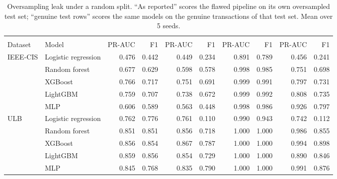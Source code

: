 \begin{table}[htbp]
\caption{Oversampling leak under a random split. ``As reported'' scores the flawed pipeline on its own oversampled test set; ``genuine test rows'' scores the same models on the genuine transactions of that test set. Mean over 5 seeds.}
\label{tab:smote}
\small
\begin{tabular}{llrrrrrrrr}
\toprule
 &  &  &  &  &  \\
\cmidrule(lr){3-4}\cmidrule(lr){5-6}\cmidrule(lr){7-8}\cmidrule(lr){9-10}
Dataset & Model & PR-AUC & F1 & PR-AUC & F1 & PR-AUC & F1 & PR-AUC & F1 \\
\midrule
IEEE-CIS & Logistic regression & 0.476 & 0.442 & 0.449 & 0.234 & 0.891 & 0.789 & 0.456 & 0.241 \\
 & Random forest & 0.677 & 0.629 & 0.598 & 0.578 & 0.998 & 0.985 & 0.751 & 0.698 \\
 & XGBoost & 0.766 & 0.717 & 0.751 & 0.691 & 0.999 & 0.991 & 0.797 & 0.731 \\
 & LightGBM & 0.759 & 0.707 & 0.738 & 0.672 & 0.999 & 0.992 & 0.808 & 0.735 \\
 & MLP & 0.606 & 0.589 & 0.563 & 0.448 & 0.998 & 0.986 & 0.926 & 0.797 \\
\addlinespace
ULB & Logistic regression & 0.762 & 0.776 & 0.761 & 0.110 & 0.990 & 0.943 & 0.742 & 0.112 \\
 & Random forest & 0.851 & 0.851 & 0.856 & 0.718 & 1.000 & 1.000 & 0.986 & 0.855 \\
 & XGBoost & 0.856 & 0.854 & 0.867 & 0.787 & 1.000 & 1.000 & 0.994 & 0.898 \\
 & LightGBM & 0.859 & 0.856 & 0.854 & 0.729 & 1.000 & 1.000 & 0.890 & 0.846 \\
 & MLP & 0.845 & 0.768 & 0.835 & 0.790 & 1.000 & 1.000 & 0.991 & 0.876 \\
\bottomrule
\end{tabular}
\end{table}
